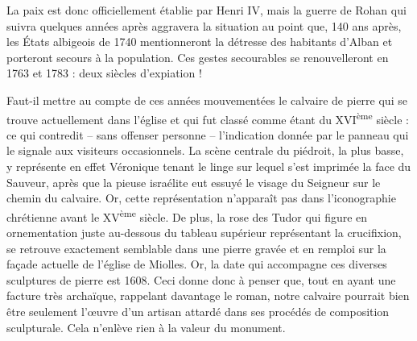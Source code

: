 

La paix est donc officiellement établie par Henri IV, mais la guerre de Rohan qui suivra quelques années après aggravera la situation au point que, 140 ans après, les États albigeois de 1740 mentionneront la détresse des habitants d'Alban et porteront secours à la population. Ces gestes secourables se renouvelleront en 1763 et 1783 : deux siècles d'expiation !

Faut-il mettre au compte de ces années mouvementées le calvaire de pierre qui se trouve actuellement dans l'église et qui fut classé comme étant du XVI\textsuperscript{ème} siècle : ce qui contredit -- sans offenser personne -- l'indication donnée par le panneau qui le signale aux visiteurs occasionnels. La scène centrale du piédroit, la plus basse, y représente en effet Véronique tenant le linge sur lequel s'est imprimée la face du Sauveur, après que la pieuse israélite eut essuyé le visage du Seigneur sur le chemin du calvaire. Or, cette représentation n'apparaît pas dans l'iconographie chrétienne avant le XV\textsuperscript{ème} siècle. De plus, la rose des Tudor qui figure en ornementation juste au-dessous du tableau supérieur représentant la crucifixion, se retrouve exactement semblable dans une pierre gravée et en remploi sur la façade actuelle de l'église de Miolles. Or, la date qui accompagne ces diverses sculptures de pierre est 1608. Ceci donne donc à penser que, tout en ayant une facture très archaïque, rappelant davantage le roman, notre calvaire pourrait bien être seulement l'œuvre d'un artisan attardé dans ses procédés de composition sculpturale. Cela n'enlève rien à la valeur du monument.

